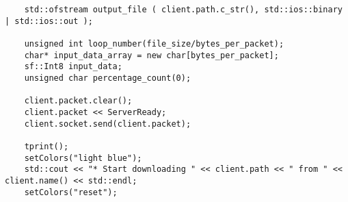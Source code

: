 \begin{lstlisting}
    std::ofstream output_file ( client.path.c_str(), std::ios::binary | std::ios::out );

    unsigned int loop_number(file_size/bytes_per_packet);
    char* input_data_array = new char[bytes_per_packet];
    sf::Int8 input_data;
    unsigned char percentage_count(0);

    client.packet.clear();
    client.packet << ServerReady;
    client.socket.send(client.packet);

    tprint();
    setColors("light blue");
    std::cout << "* Start downloading " << client.path << " from " << client.name() << std::endl;
    setColors("reset");
\end{lstlisting}